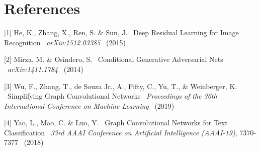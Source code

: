 \documentclass{article}
\begin{document}
\section*{References}
\medskip
\small
[1] He, K., Zhang, X., Ren, S. \& Sun, J. \ Deep Residual Learning for Image Recognition \ {\it arXiv:1512.03385} \ (2015)

[2] Mirza, M. \& Osindero, S. \ Conditional Generative Adversarial Nets \ {\it arXiv:1411.1784} \ (2014)

[3] Wu, F., Zhang, T., de Souza Jr., A., Fifty, C., Yu, T., \& Weinberger, K. \ Simplifying Graph Convolutional Networks \ {\it Proceedings of the 36th International Conference on Machine Learning} \ (2019)

[4] Yao, L., Mao, C. \& Luo, Y. \ Graph Convolutional Networks for Text Classification \ {\it 33rd AAAI Conference on Artificial Intelligence (AAAI-19)}, 7370-7377 \ (2018)
\end{document}
